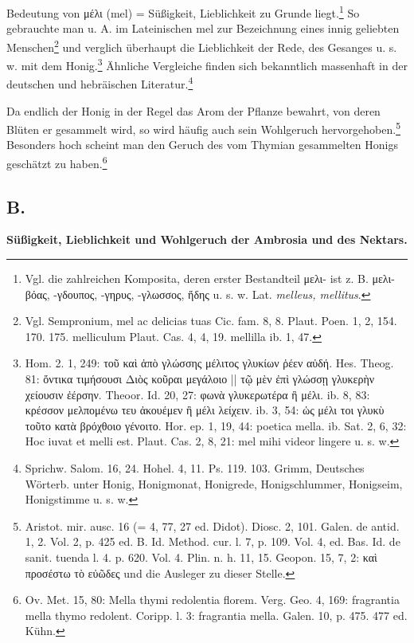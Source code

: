 \documentclass[a4paper, 11pt, oneside]{article}
\begin{document}
Bedeutung von μέλι (mel) = Süßigkeit, Lieblichkeit zu Grunde liegt.\footnote{Vgl. die zahlreichen Komposita, deren erster Bestandteil μελι- ist z. B. μελι-βόας, -γδουπος, -γηρυς, -γλωσσος, ἥδης u. s. w. Lat. \emph{melleus, mellitus}.} So gebrauchte man u. A. im Lateinischen mel zur Bezeichnung eines innig geliebten Menschen\footnote{Vgl. Sempronium, mel ac delicias tuas Cic. fam. 8, 8. Plaut. Poen. 1, 2, 154. 170. 175. melliculum Plaut. Cas. 4, 4, 19. mellilla ib. 1, 47.} und verglich überhaupt die Lieblichkeit der Rede, des Gesanges u. s. w. mit dem Honig.\footnote{Hom. 2. 1, 249: τοῦ καὶ ἀπὸ γλώσσης μέλιτος γλυκίων ῥέεν αὐδή. Hes. Theog. 81: ὄντικα τιμήσουσι Διὸς κοῦραι μεγάλοιο || τῷ μὲν ἐπὶ γλώσσῃ γλυκερὴν χείουσιν ἐέρσην. Theoor. Id. 20, 27: φωνὰ γλυκερωτέρα ἢ μέλι. ib. 8, 83: κρέσσον μελπομένω τευ ἀκουέμεν ἢ μέλι λείχειν. ib. 3, 54: ὡς μέλι τοι γλυκὺ τοῦτο κατὰ βρόχθοιο γένοιτο. Hor. ep. 1, 19, 44: poetica mella. ib. Sat. 2, 6, 32: Hoc iuvat et melli est. Plaut. Cas. 2, 8, 21: mel mihi videor lingere u. s. w.} Ähnliche Vergleiche finden sich bekanntlich massenhaft in der deutschen und hebräischen Literatur.\footnote{Sprichw. Salom. 16, 24. Hohel. 4, 11. Ps. 119. 103. Grimm, Deutsches Wörterb. unter Honig, Honigmonat, Honigrede, Honigschlummer, Honigseim, Honigstimme u. s. w.}

Da endlich der Honig in der Regel das Arom der Pflanze bewahrt, von deren Blüten er gesammelt wird, so wird häufig auch sein Wohlgeruch hervorgehoben.\footnote{Aristot. mir. ausc. 16 (= 4, 77, 27 ed. Didot). Diosc. 2, 101. Galen. de antid. 1, 2. Vol. 2, p. 425 ed. B. Id. Method. cur. l. 7, p. 109. Vol. 4, ed. Bas. Id. de sanit. tuenda l. 4. p. 620. Vol. 4. Plin. n. h. 11, 15. Geopon. 15, 7, 2: καὶ προσέστω τὸ εὐῶδες und die Ausleger zu dieser Stelle.} Besonders hoch scheint man den Geruch des vom Thymian gesammelten Honigs geschätzt zu haben.\footnote{Ov. Met. 15, 80: Mella thymi redolentia florem. Verg. Geo. 4, 169: fragrantia mella thymo redolent. Coripp. l. 3: fragrantia mella. Galen. 10, p. 475. 477 ed. Kühn.}

\subsection{B.}
\begin{center}
\textbf{Süßigkeit, Lieblichkeit und Wohlgeruch der Ambrosia und des Nektars.}
\end{center}
\end{document}
